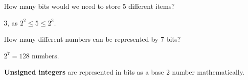 \begin{eg}
	How many bits would we need to store 5 different items?
\end{eg}
\begin{explanation}
	3, as \( 2^2 \le 5\le 2^3 \).
\end{explanation}

\begin{eg}
	How many different numbers can be represented by 7 bits?
\end{eg}
\begin{explanation}
	\( 2^7=128 \) numbers.
\end{explanation}

\begin{definition}
	\textbf{Unsigned integers} are represented in bits as a base 2 number mathematically.
\end{definition}
